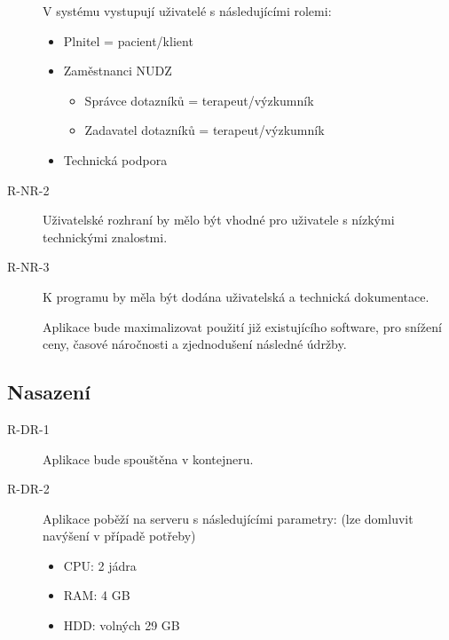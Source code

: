 \begin{description}
    \item[]
    V systému vystupují uživatelé s následujícími rolemi:

    \begin{itemize}
        \item
        Plnitel = pacient/klient

        \item
        Zaměstnanci NUDZ

        \begin{itemize}
            \item
            Správce dotazníků = terapeut/výzkumník
            \item
            Zadavatel dotazníků = terapeut/výzkumník
        \end{itemize}
        \item
        Technická podpora
    \end{itemize}
    \item[R-NR-2]
    Uživatelské rozhraní by mělo být vhodné pro uživatele s nízkými technickými znalostmi.
    \item[R-NR-3]
    K programu by měla být dodána uživatelská a technická dokumentace.
    \item[]
    Aplikace bude maximalizovat použití již existujícího software, pro snížení ceny, časové náročnosti a zjednodušení následné údržby.
\end{description}

\subsection{Nasazení}\label{subsec:deployment}

\begin{description}
    \item[R-DR-1]
    Aplikace bude spouštěna v kontejneru.
    \item[R-DR-2]
    Aplikace poběží na serveru s následujícími parametry: (lze domluvit navýšení v případě potřeby)

    \begin{itemize}
        \item
        CPU: 2 jádra
        \item
        RAM: 4 GB
        \item
        HDD: volných 29 GB
    \end{itemize}
\end{description}

